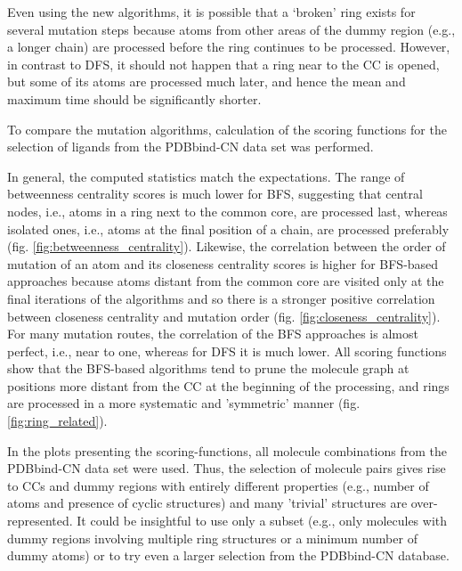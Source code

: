Even using the new algorithms, it is possible 
that a \textquoteleft broken\textquoteright{} ring exists for several mutation steps
 because atoms from other areas of the dummy region (e.g.,
a longer chain) are processed before the ring continues to be processed. However, in contrast to DFS,
it should not happen that a ring near to the CC is opened, but some of its atoms are processed much later, and hence the mean and maximum time should be significantly shorter. 

To compare the mutation algorithms, calculation of the scoring functions for the selection of ligands from the PDBbind-CN data set was performed. 

In general, the computed statistics match the expectations. The range of betweenness centrality scores is much lower for BFS, suggesting that central nodes, i.e., atoms in a ring next to the common core, are processed last, whereas isolated ones, i.e., atoms at the final position of a chain, are processed preferably (fig. \ref{fig:betweenness_centrality}).
Likewise, the correlation between the order of mutation of an atom and its closeness centrality scores is higher for BFS-based approaches because atoms distant from the common core are visited only at the final iterations of the algorithms and so there is a stronger positive correlation between closeness centrality and  mutation order (fig. \ref{fig:closeness_centrality}). For many mutation routes, the correlation of the BFS approaches is almost perfect, i.e., near to one, whereas for DFS it is much lower.
All scoring functions show that the BFS-based algorithms tend to prune the molecule graph at positions more distant from the CC at the beginning of the processing, and rings are processed in a more systematic and 'symmetric' manner (fig. \ref{fig:ring_related}).

In the plots presenting the scoring-functions, all molecule combinations
from the PDBbind-CN data set were used. Thus, the selection of molecule pairs gives rise to CCs and dummy regions with entirely different properties (e.g., number of atoms and presence of cyclic structures) and many  'trivial' structures are over-represented. It could be insightful to use
only a subset (e.g., only molecules with dummy regions involving multiple
ring structures or a minimum number of dummy atoms) or to try even a larger selection from the PDBbind-CN database.




